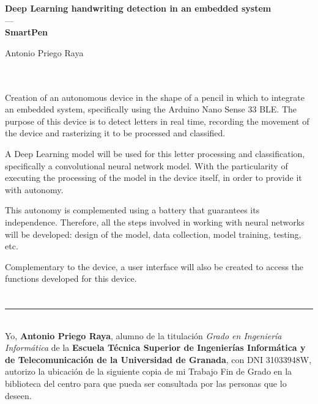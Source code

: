 \begin{center}
       {\large\bfseries Deep Learning handwriting detection in an embedded system\\
       }
       \textsc{---}\\
       {\small\bfseries SmartPen}\\
       \end{center}
       \begin{center}
       Antonio Priego Raya\\
\end{center}

\\

\vspace{0.7cm}
\\

Creation of an autonomous device in the shape of a pencil in which to integrate
an embedded system, specifically using the Arduino Nano Sense 33 BLE.
The purpose of this device is to detect letters in real time,
recording the movement of the device and rasterizing it to be processed and classified.

A Deep Learning model will be used for this letter processing and classification,
specifically a convolutional neural network model.
With the
particularity of executing the processing of the model in the device itself,
in order to provide it with autonomy.

This autonomy is complemented using a battery that guarantees its independence.
Therefore, all the steps involved in working with neural networks will be developed:
design of the model, data collection, model training, testing, etc.

Complementary to the device, a user interface will also be created to access the
functions developed for this device.

\chapter*{}
\thispagestyle{empty}

\noindent\rule[-1ex]{\textwidth}{2pt}\\[4.5ex]

Yo, \textbf{Antonio Priego Raya}, alumno de la titulación \textit{Grado en Ingeniería Informática}
de la \textbf{Escuela Técnica Superior
de Ingenierías Informática y de Telecomunicación de la Universidad de Granada}, con DNI 31033948W, autorizo la
ubicación de la siguiente copia de mi Trabajo Fin de Grado en la biblioteca del centro para que pueda ser
consultada por las personas que lo deseen.

